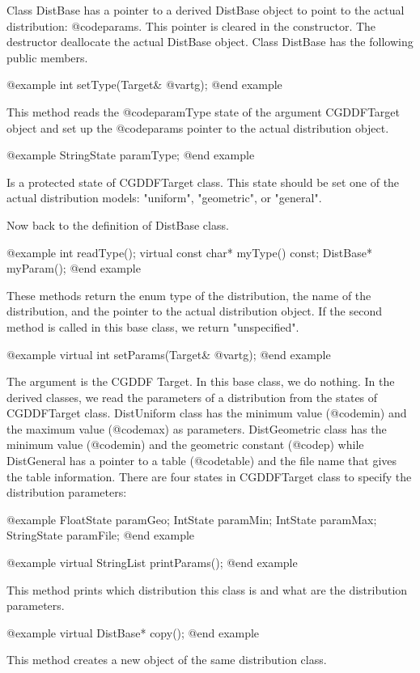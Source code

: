 {Class DistBase has a pointer to a derived DistBase object to point to the
actual distribution: @code{params}. This pointer is cleared in
the constructor. The destructor deallocate the actual DistBase object.
Class DistBase has the following public members.

@example
int setType(Target& @var{tg});
@end example

This method reads the @code{paramType} state of the argument CGDDFTarget
object and set up the @code{params} pointer to the actual distribution
object.

@example
StringState paramType;
@end example

Is a protected state of CGDDFTarget class. This state should be set
one of the actual distribution models: "uniform", "geometric", or
"general".

Now back to the definition of DistBase class.

@example
int readType();
virtual const char* myType() const;
DistBase* myParam();
@end example

These methods return the  enum type of the distribution, the name
of the distribution, and the pointer to the actual distribution object. If
the second method is called in this base class, we return "unspecified".

@example
virtual int setParams(Target& @var{tg});
@end example

The argument is the CGDDF Target. In this base class, we do nothing.
In the derived classes, we read the parameters of a distribution from
the states of CGDDFTarget class. DistUniform class has the minimum
value (@code{min}) and the maximum value (@code{max}) as parameters.
DistGeometric class has the minimum value (@code{min}) and the geometric
constant (@code{p}) while DistGeneral has a pointer to a table (@code{table})
and the file name that gives the table information. There are four states
in CGDDFTarget class to specify the distribution parameters:

@example
FloatState paramGeo;
IntState paramMin;
IntState paramMax;
StringState paramFile;
@end example

@example
virtual StringList printParams();
@end example

This method prints which distribution this class is and what are the
distribution parameters.

@example
virtual DistBase* copy();
@end example

This method creates a new object of the same distribution class.

}
